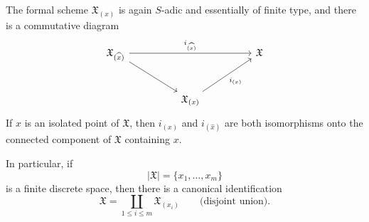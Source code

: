 
The formal scheme $\mathfrak X_{(x)}$ is again $S$-adic and
essentially of finite type, and there is a commutative diagram
\[
\begin{tikzcd}[column sep=huge,row sep=large]
\mathfrak X_{(\widehat{x})}
  \arrow[rr,"i_{(\widehat{x})}"] \arrow[dr]
  && \mathfrak X \\
& \mathfrak X_{(x)} \arrow[ur,"i_{(x)}"'] & {}
\end{tikzcd}
\]
If $x$ is an isolated point of $\mathfrak X$, then
$i_{(x)}$ and $i_{(\widehat{x})}$ are both isomorphisms onto the
connected component of $\mathfrak X$ containing $x$.

In particular, if
\[
|\mathfrak X|=\{x_1,\ldots,x_m\}
\]
is a finite discrete space, then there is a canonical identification
\[
\mathfrak X=\coprod_{1\leq i\leq m}\mathfrak X_{(x_i)}
\qquad\text{(disjoint union)}.
\]
